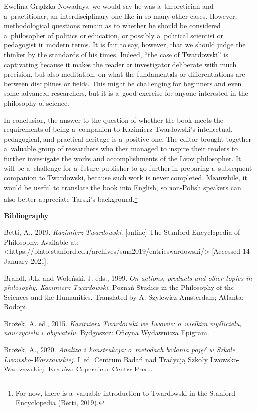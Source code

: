 \begin{newrevengenv}{Ewelina Grądzka}
Nowadays, we would say he was a~theoretician and a~practitioner, an interdisciplinary one like in so many other cases. However, methodological questions remain as to whether he should be considered a~philosopher of politics or education, or possibly a~political scientist or pedagogist in modern terms. It is fair to say, however, that we should judge the thinker by the standards of his times. Indeed, ``the case of Twardowski'' is captivating because it makes the reader or investigator deliberate with much precision, but also meditation, on what the fundamentals or differentiations are between disciplines or fields. This might be challenging for beginners and even some advanced researchers, but it is a~good exercise for anyone interested in the philosophy of science.

In conclusion, the answer to the question of whether the book meets the requirements of being a~companion to Kazimierz Twardowski's intellectual, pedagogical, and practical heritage is a~positive one. The editor brought together a~valuable group of researchers who then managed to inspire their readers to further investigate the works and accomplishments of the Lvov philosopher. It will be a~challenge for a~future publisher to go further in preparing a~subsequent companion to Twardowski, because such work is never completed. Meanwhile, it would be useful to translate the book into English, so non-Polish speakers can also better appreciate Tarski's background.\footnote{For now, there is a~valuable introduction to Twardowski in the Stanford Encyclopedia (Betti, 2019).}

\textbf{Bibliography}

Betti, A., 2019. \textit{Kazimierz Twardowski}. [online] The Stanford Encyclopedia of Philosophy. Available at: {\textless}https://plato.stanford.edu/archives/sum2019/entrieswardowski/{\textgreater} [Accessed 14 January 2021].

Brandl, J.L. and Woleński, J. eds., 1999. \textit{On actions, products and other topics in philosophy. Kazimierz Twardowski}. Poznań Studies in the Philosophy of the Sciences and the Humanities. Translated by A. Szylewicz Amsterdam; Atlanta: Rodopi.

Brożek, A. ed., 2015. \textit{Kazimierz Twardowski we Lwowie: o~wielkim myślicielu, nauczycielu i~obywatelu}. Bydgoszcz: Oficyna Wydawnicza Epigram.

Brożek, A., 2020. \textit{Analiza i~konstrukcja: o~metodach badania pojęć w~Szkole Lwowsko-Warszawskiej}. I~ed. Centrum Badań nad Tradycją Szkoły Lwowsko-Warszawskiej. Kraków: Copernicus Center Press.


\end{newrevengenv}
